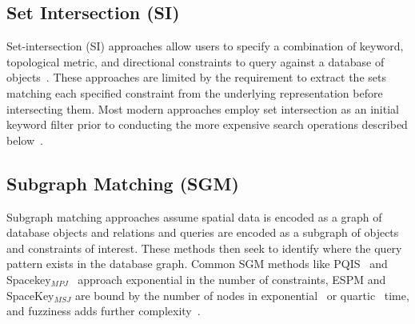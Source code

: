 \subsection{Set Intersection (SI)}
\par{  
    Set-intersection (SI) approaches allow users to specify a combination of keyword, topological metric, and directional constraints to query against a database of objects~\cite{DiLoreto1996, Soffer1996, Soffer1997, Soffer1998a,Soffer1999}.
    These approaches are limited by the requirement to extract the sets matching each specified constraint from the underlying representation before intersecting them. 
    Most modern approaches employ set intersection as an initial keyword filter prior to conducting the more expensive search operations described below~\cite{Schwering2014, Osul2023}.
}    





\subsection{Subgraph Matching (SGM)}
\par{
    Subgraph matching approaches assume spatial data is encoded as a graph of database objects and relations and queries are encoded as a subgraph of objects and constraints of interest.
    These methods then seek to identify where the query pattern exists in the database graph. 
    Common SGM methods like PQIS~\cite{Folkers2000} and Spacekey$_{MPJ}$~\cite{Fang2019} approach exponential in the number of constraints, ESPM and SpaceKey$_{MSJ}$ are bound by the number of nodes in exponential~\cite{Chen2019} or quartic~\cite{Fang2019} time, and fuzziness adds further complexity~\cite{Fang2019}.
    }
    
